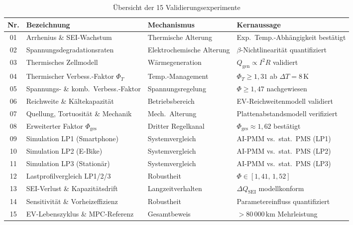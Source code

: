 ﻿\documentclass[12pt,a4paper]{article}
\begin{document}
	\begin{table}
		\centering
		\caption{Übersicht der 15 Validierungsexperimente}
		\label{tab:exp_overview}
		\small
		\begin{tabular}{clll}
			\toprule
			\textbf{Nr.} & \textbf{Bezeichnung} & \textbf{Mechanismus} & \textbf{Kernaussage} \\
			\midrule
			01 & Arrhenius \& SEI-Wachstum & Thermische Alterung & Exp.\ Temp.-Abhängigkeit bestätigt \\
			02 & Spannungsdegradationsraten & Elektrochemische Alterung & $\beta$-Nichtlinearität quantifiziert \\
			03 & Thermisches Zellmodell & Wärmegeneration & $Q_\mathrm{gen} \propto I^2 R$ validiert \\
			04 & Thermischer Verbess.-Faktor $\Phi_T$ & Temp.-Management & $\Phi_T \geq 1{,}31$ ab $\Delta T=8\,\mathrm{K}$ \\
			05 & Spannungs- \& komb.\ Verbess.-Faktor & Spannungsregelung & $\Phi \geq 1{,}47$ nachgewiesen \\
			06 & Reichweite \& Kältekapazität & Betriebsbereich & EV-Reichweitenmodell validiert \\
			07 & Quellung, Tortuosität \& Mechanik & Mech.\ Alterung & Plattenabstandsmodell verifiziert \\
			08 & Erweiterter Faktor $\Phi_\mathrm{ges}$ & Dritter Regelkanal & $\Phi_\mathrm{ges} \approx 1{,}62$ bestätigt \\
			09 & Simulation LP1 (Smartphone) & Systemvergleich & AI-PMM vs.\ stat.\ PMS (LP1) \\
			10 & Simulation LP2 (E-Bike) & Systemvergleich & AI-PMM vs.\ stat.\ PMS (LP2) \\
			11 & Simulation LP3 (Stationär) & Systemvergleich & AI-PMM vs.\ stat.\ PMS (LP3) \\
			12 & Lastprofilvergleich LP1/2/3 & Robustheit & $\Phi \in [1{,}41,\, 1{,}52]$ \\
			13 & SEI-Verlust \& Kapazitätsdrift & Langzeitverhalten & $\Delta Q_\mathrm{SEI}$ modellkonform \\
			14 & Sensitivität \& Vorheizeffizienz & Robustheit & Parametereinfluss quantifiziert \\
			15 & EV-Lebenszyklus \& MPC-Referenz & Gesamtbeweis & $> 80\,000\,\mathrm{km}$ Mehrleistung \\
			\bottomrule
		\end{tabular}
	\end{table}
\end{document}
